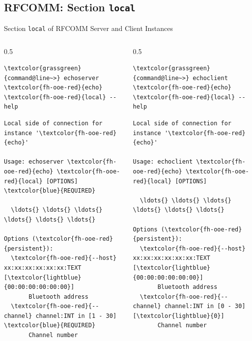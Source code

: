 \subsection{RFCOMM: Section \textcolor{fh-ooe-red}{\lstinline|local|}}

\begin{frame}[fragile]{Section \alert{\lstinline|local|} of RFCOMM Server and Client Instances}
\begin{columns}[T, onlytextwidth]
\begin{column}{0.5\textwidth}
\begin{scriptsize}
\begin{Verbatim}[commandchars=\\\{\}]
\textcolor{grassgreen}{command@line~>} echoserver \textcolor{fh-ooe-red}{echo} \textcolor{fh-ooe-red}{local} --help
\end{Verbatim}
\begin{Verbatim}[commandchars=\\\{\},frame=leftline,rulecolor=\color{fh-ooe-red}]
Local side of connection for instance '\textcolor{fh-ooe-red}{echo}'

Usage: echoserver \textcolor{fh-ooe-red}{echo} \textcolor{fh-ooe-red}{local} [OPTIONS] \textcolor{blue}{REQUIRED}

  \ldots{} \ldots{} \ldots{} \ldots{} \ldots{} \ldots{}

Options (\textcolor{fh-ooe-red}{persistent}):
  \textcolor{fh-ooe-red}{--host} xx:xx:xx:xx:xx:xx:TEXT [\textcolor{lightblue}{00:00:00:00:00:00}]
       Bluetooth address
  \textcolor{fh-ooe-red}{--channel} channel:INT in [1 - 30] \textcolor{blue}{REQUIRED}
       Channel number
\end{Verbatim}
\end{scriptsize}
\end{column}
\begin{column}{0.5\textwidth}
\begin{scriptsize}
\begin{Verbatim}[commandchars=\\\{\}]
\textcolor{grassgreen}{command@line~>} echoclient \textcolor{fh-ooe-red}{echo} \textcolor{fh-ooe-red}{local} --help
\end{Verbatim}
\begin{Verbatim}[commandchars=\\\{\},frame=leftline,rulecolor=\color{fh-ooe-red}]
Local side of connection for instance '\textcolor{fh-ooe-red}{echo}'

Usage: echoclient \textcolor{fh-ooe-red}{echo} \textcolor{fh-ooe-red}{local} [OPTIONS]

  \ldots{} \ldots{} \ldots{} \ldots{} \ldots{} \ldots{}

Options (\textcolor{fh-ooe-red}{persistent}):
  \textcolor{fh-ooe-red}{--host} xx:xx:xx:xx:xx:xx:TEXT [\textcolor{lightblue}{00:00:00:00:00:00}]
       Bluetooth address
  \textcolor{fh-ooe-red}{--channel} channel:INT in [0 - 30] [\textcolor{lightblue}{0}]
       Channel number
\end{Verbatim}
\end{scriptsize}
\end{column}
\end{columns}
\end{frame}
